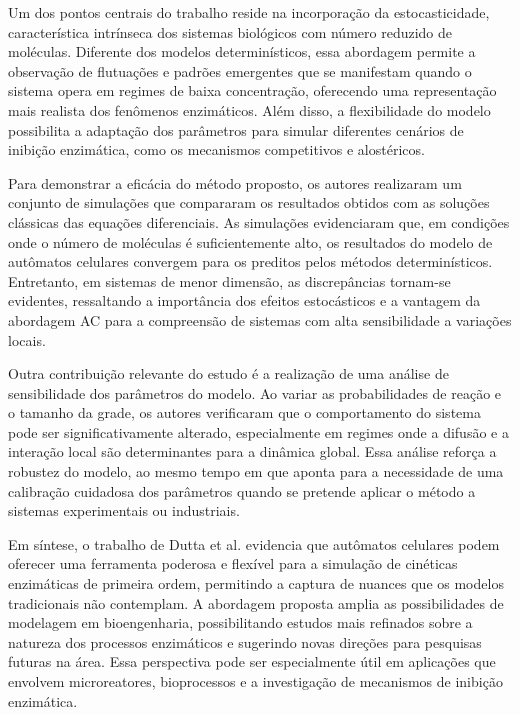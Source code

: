 \documentclass[12pt,oneside]{report}
\begin{document}
Um dos pontos centrais do trabalho reside na incorporação da estocasticidade, característica intrínseca dos sistemas biológicos com número reduzido de moléculas. Diferente dos modelos determinísticos, essa abordagem permite a observação de flutuações e padrões emergentes que se manifestam quando o sistema opera em regimes de baixa concentração, oferecendo uma representação mais realista dos fenômenos enzimáticos. Além disso, a flexibilidade do modelo possibilita a adaptação dos parâmetros para simular diferentes cenários de inibição enzimática, como os mecanismos competitivos e alostéricos.

Para demonstrar a eficácia do método proposto, os autores realizaram um conjunto de simulações que compararam os resultados obtidos com as soluções clássicas das equações diferenciais. As simulações evidenciaram que, em condições onde o número de moléculas é suficientemente alto, os resultados do modelo de autômatos celulares convergem para os preditos pelos métodos determinísticos. Entretanto, em sistemas de menor dimensão, as discrepâncias tornam-se evidentes, ressaltando a importância dos efeitos estocásticos e a vantagem da abordagem AC para a compreensão de sistemas com alta sensibilidade a variações locais.

Outra contribuição relevante do estudo é a realização de uma análise de sensibilidade dos parâmetros do modelo. Ao variar as probabilidades de reação e o tamanho da grade, os autores verificaram que o comportamento do sistema pode ser significativamente alterado, especialmente em regimes onde a difusão e a interação local são determinantes para a dinâmica global. Essa análise reforça a robustez do modelo, ao mesmo tempo em que aponta para a necessidade de uma calibração cuidadosa dos parâmetros quando se pretende aplicar o método a sistemas experimentais ou industriais.

Em síntese, o trabalho de Dutta et al. \cite{dutta2015generalized} evidencia que autômatos celulares podem oferecer uma ferramenta poderosa e flexível para a simulação de cinéticas enzimáticas de primeira ordem, permitindo a captura de nuances que os modelos tradicionais não contemplam. A abordagem proposta amplia as possibilidades de modelagem em bioengenharia, possibilitando estudos mais refinados sobre a natureza dos processos enzimáticos e sugerindo novas direções para pesquisas futuras na área. Essa perspectiva pode ser especialmente útil em aplicações que envolvem microreatores, bioprocessos e a investigação de mecanismos de inibição enzimática.
\end{document}
